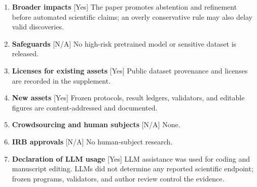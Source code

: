 \begin{enumerate}[leftmargin=*]
human participants, private data, or consequential deployment.
\item \textbf{Broader impacts} [Yes] The paper promotes abstention and refinement before automated
scientific claims; an overly conservative rule may also delay valid discoveries.
\item \textbf{Safeguards} [N/A] No high-risk pretrained model or sensitive dataset is released.
\item \textbf{Licenses for existing assets} [Yes] Public dataset provenance and licenses are
recorded in the supplement.
\item \textbf{New assets} [Yes] Frozen protocols, result ledgers, validators, and editable figures
are content-addressed and documented.
\item \textbf{Crowdsourcing and human subjects} [N/A] None.
\item \textbf{IRB approvals} [N/A] No human-subject research.
\item \textbf{Declaration of LLM usage} [Yes] LLM assistance was used for coding and manuscript
editing. LLMs did not determine any reported scientific endpoint; frozen programs, validators,
and author review control the evidence.
\end{enumerate}
